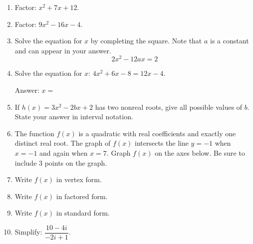 \begin{enumerate}[leftmargin=*, label=\textbf{\arabic*.}, resume]

  \item Factor: $x^2 + 7x + 12$. 
  \vgap

  \item Factor: $9x^2 - 16x - 4$. 
  \vgappp

  \item Solve the equation for $x$ by completing the square. Note that $a$ is a constant and can appear in your answer. 
  \[
  2x^2 - 12ax = 2
  \]
  \vgappp

  \item Solve the equation for $x$: $4x^2 + 6x - 8 = 12x - 4$. 

  Answer: $x = $ \blank
  \vgappp

  \item If $h(x) = 3x^2 - 2bx + 2$ has two nonreal roots, give all possible values of $b$. State your answer in interval notation. 
  \vgappp

  \item The function $f(x)$ is a quadratic with real coefficients and exactly one distinct real root. The graph of $f(x)$ intersects the line $y = -1$ when $x = -1$ and again when $x = 7$. Graph $f(x)$ on the axes below. Be sure to include 3 points on the graph. 

  \begin{center}
  \end{center}
  \vgapp

  \item Write $f(x)$ in vertex form. 
  \vgapp

  \item Write $f(x)$ in factored form. 
  \vgap

  \item Write $f(x)$ in standard form. 
  \vgappp

  \item Simplify: $\dfrac{10-4i}{-2i+1}$. 
  \vgappp


\end{enumerate}
